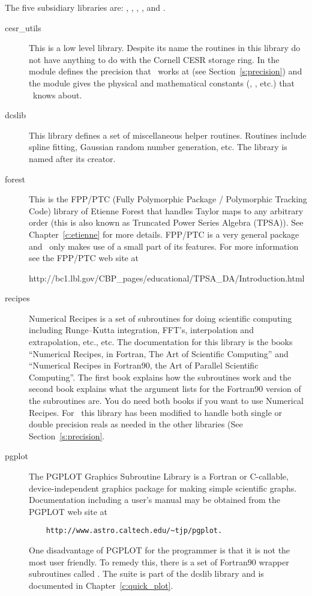 The five subsidiary libraries are: , ,
, , and .
\begin{description}
\item[cesr\_utils] This is a low level library. Despite its name the
routines in this library do not have anything to do with the Cornell
CESR storage ring.  In  the module 
defines the precision that \bmad\ works at (see
Section~\ref{s:precision}) and the module 
gives the physical and mathematical constants (, ,
etc.) that \bmad\ knows about.

\item[dcslib] This library defines a set of miscellaneous helper
routines.  Routines include spline fitting, Gaussian random number
generation, etc. The library is named after its creator.

\item[forest] This is the FPP/PTC (Fully Polymorphic Package /
Polymorphic Tracking Code) library of Etienne Forest that handles
Taylor maps to any arbitrary order (this is also known as Truncated
Power Series Algebra (TPSA)). See Chapter~\ref{c:etienne} for more
details.  FPP/PTC is a very general package and \bmad\ only makes use
of a small part of its features.  For more information see the FPP/PTC
web site at
\begin{example} 
   http://bc1.lbl.gov/CBP_pages/educational/TPSA_DA/Introduction.html
\end{example}

\item[recipes] Numerical Recipes is a set of subroutines for doing
scientific computing including Runge--Kutta integration, FFT's,
interpolation and extrapolation, etc., etc. The documentation for this
library is the books ``Numerical Recipes, in Fortran, The Art of
Scientific Computing''\cite{b:nr} and ``Numerical Recipes in
Fortran90, the Art of Parallel Scientific Computing''\cite{b:nr.f90}.
The first book explains how the subroutines work and the second book
explains what the argument lists for the Fortran90 version of the
subroutines are. You do need both books if you want to use Numerical
Recipes.  For \bmad\ this library has been modified to handle both
single or double precision reals as needed in the other libraries (See
Section~\ref{s:precision}.

\item[pgplot] The PGPLOT Graphics Subroutine Library is a Fortran or
C-callable, device-independent graphics package for making simple
scientific graphs. Documentation including a user's manual may be
obtained from the PGPLOT web site at
\begin{verbatim}
    http://www.astro.caltech.edu/~tjp/pgplot.
\end{verbatim} 
One disadvantage of PGPLOT for the programmer is that it is not the
most user friendly. To remedy this, there is a set of Fortran90
wrapper subroutines called .  The 
suite is part of the dcslib library and is documented in
Chapter~\ref{c:quick_plot}.

\end{description}

